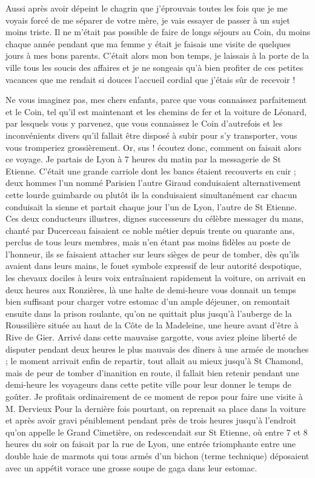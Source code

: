 \documentclass[11pt,a4paper]{report}
\begin{document}
Aussi après avoir dépeint le chagrin que j'éprouvais toutes les fois que je me voyais forcé de me séparer de votre mère, je vais essayer de passer à un sujet moins triste. Il ne m'était pas possible de faire de longs séjours au Coin, du moins chaque année pendant que ma femme y était je faisais une visite de quelques jours à mes bons parents. C'était alors mon bon temps, je laissais à la porte de la ville tous les soucis des affaires et je ne songeais qu'à bien profiter de ces petites vacances que me rendait si douces l'accueil cordial que j'étais sûr de recevoir !

Ne vous imaginez pas, mes chers enfants, parce que vous connaissez parfaitement et le Coin, tel qu'il est maintenant et les chemins de fer et la voiture de Léonard, par lesquels vous y parvenez, que vous connaissez le Coin d'autrefois et les inconvénients divers qu'il fallait être disposé à subir pour s'y transporter, vous vous tromperiez grossièrement. Or, sus ! écoutez donc, comment on faisait alors ce voyage. Je partais de Lyon à 7 heures du matin par la messagerie de St Etienne. C'était une grande carriole dont les bancs étaient recouverts en cuir ; deux hommes l'un nommé Parisien l'autre Giraud conduisaient alternativement cette lourde guimbarde ou plutôt ils la conduisaient simultanément car chacun conduisait la sienne et partait chaque jour l'un de Lyon, l'autre de St Etienne. Ces deux conducteurs illustres, dignes successeurs du célèbre messager du mans, chanté par Ducerceau faisaient ce noble métier depuis trente ou quarante ans, perclus de tous leurs membres, mais n'en étant pas moins fidèles au poste de l'honneur, ils se faisaient attacher sur leurs sièges de peur de tomber, dès qu'ils avaient dans leurs mains, le fouet symbole expressif de leur autorité despotique, les chevaux dociles à leurs voix entraînaient rapidement la voiture, on arrivait en deux heures aux Ronzières, là une halte de demi-heure vous donnait un temps bien suffisant pour charger votre estomac d'un ample déjeuner, on remontait ensuite dans la prison roulante, qu'on ne quittait plus jusqu'à l'auberge de la Roussilière située au haut de la Côte de la Madeleine, une heure avant d'être à Rive de Gier. Arrivé dans cette mauvaise gargotte, vous aviez pleine liberté de disputer pendant deux heures le plus mauvais des dîners à une armée de mouches ; le moment arrivait enfin de repartir, tout allait au mieux jusqu'à St Chamond, mais de peur de tomber d'inanition en route, il fallait bien retenir pendant une demi-heure les voyageurs dans cette petite ville pour leur donner le temps de goûter. Je profitais ordinairement de ce moment de repos pour faire une visite à M. Dervieux Pour la dernière fois pourtant, on reprenait sa place dans la voiture et après avoir gravi péniblement pendant près de trois heures jusqu'à l'endroit qu'on appelle le Grand Cimetière, on redescendait sur St Etienne, où entre 7 et 8 heures du soir on faisait par la rue de Lyon, une entrée triomphante entre une double haie de marmots qui tous armés d'un bichon (terme technique) déposaient avec un appétit vorace une grosse soupe de gaga dans leur estomac.
\end{document}
